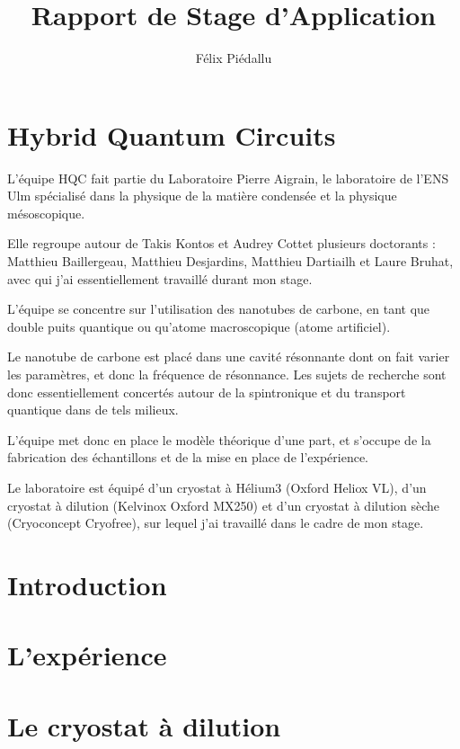 \documentclass[a4paper,12pt]{report}
\date{}
\title{Rapport de Stage d'Application}
\author{Félix Piédallu}
\begin{document}
\nocite{*}


%

\chapter*{Hybrid Quantum Circuits}
L'équipe HQC fait partie du Laboratoire Pierre Aigrain, le laboratoire de l'ENS Ulm spécialisé dans la physique de la matière condensée et la physique mésoscopique.

Elle regroupe autour de Takis Kontos et Audrey Cottet plusieurs doctorants : Matthieu Baillergeau, Matthieu Desjardins, Matthieu Dartiailh et Laure Bruhat, avec qui j'ai essentiellement travaillé durant mon stage.\newline

L'équipe se concentre sur l'utilisation des nanotubes de carbone, en tant que double puits quantique ou qu'atome macroscopique (atome artificiel).

Le nanotube de carbone est placé dans une cavité résonnante dont on fait varier les paramètres, et donc la fréquence de résonnance. Les sujets de recherche sont donc essentiellement concertés autour de la spintronique et du transport quantique dans de tels milieux.

L'équipe met donc en place le modèle théorique d'une part, et s'occupe de la fabrication des échantillons et de la mise en place de l'expérience.\newline

Le laboratoire est équipé d'un cryostat à Hélium3 (Oxford Heliox VL), d'un cryostat à dilution (Kelvinox Oxford MX250) et d'un cryostat à dilution sèche (Cryoconcept Cryofree), sur lequel j'ai travaillé dans le cadre de mon stage.





\chapter*{Introduction} %
%

\chapter{L'expérience}
%

\chapter{Le cryostat à dilution}
%
\end{document}
